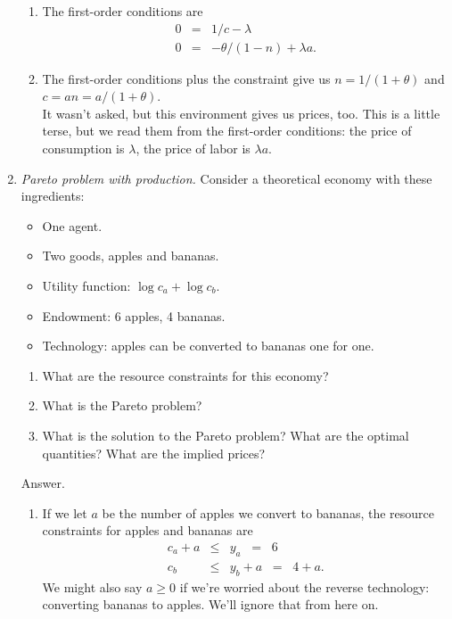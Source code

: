 \documentclass[11pt]{article}
\begin{document}
\begin{enumerate}
\begin{enumerate}
\item The first-order conditions are
\begin{eqnarray*}
    0 &=& 1/c - \lambda \\
    0 &=& - \theta/(1-n) + \lambda a .
\end{eqnarray*}
\item The first-order conditions plus the constraint give us
$ n = 1/(1+\theta) $ and $ c = an = a/(1+\theta) $.  \\
It wasn't asked, but this environment gives us prices, too.
This is a little terse, but we read them from the first-order conditions:
the price of consumption is $\lambda$, the price of labor is $\lambda a $.
\end{enumerate}

\item {\it Pareto problem with production.\/}
Consider a theoretical economy with these ingredients:
\begin{itemize}
\item One agent.
\item Two goods, apples and bananas.
\item Utility function: $ \log c_a + \log c_b $.
\item Endowment:  6 apples, 4 bananas.
\item Technology:  apples can be converted to bananas one for one.
\end{itemize}

\begin{enumerate}
\item What are the resource constraints for this economy? 
\item What is the Pareto problem?  
\item What is the solution to the Pareto problem?
What are the optimal quantities?  What are the implied prices?
\end{enumerate}

Answer. 
\begin{enumerate}
\item If we let $a$ be the number of apples we convert to bananas,
the resource constraints for apples and bananas are
\begin{eqnarray*}
    c_a + a &\leq& y_a \;\;=\;\; 6 \\
    c_b &\leq& y_b + a \;\;=\;\; 4 + a.
\end{eqnarray*}
We might also say $ a\geq 0$ if we're worried about the reverse technology:
converting bananas to apples.
We'll ignore that from here on.


\end{enumerate}
\end{enumerate}
\end{document}
